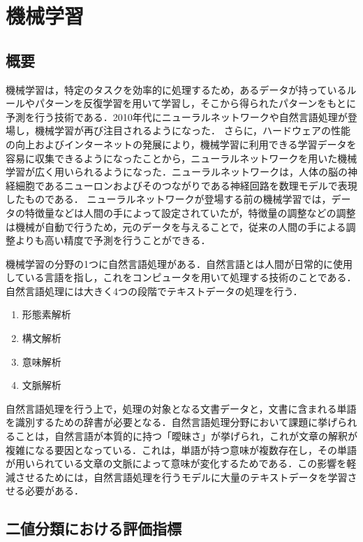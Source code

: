 \chapter{機械学習 \label{c4}}

\section{概要\label{c4s1}}
機械学習は，特定のタスクを効率的に処理するため，あるデータが持っているルールやパターンを反復学習を用いて学習し，そこから得られたパターンをもとに予測を行う技術である．2010年代にニューラルネットワークや自然言語処理が登場し，機械学習が再び注目されるようになった．
さらに，ハードウェアの性能の向上およびインターネットの発展により，機械学習に利用できる学習データを容易に収集できるようになったことから，ニューラルネットワークを用いた機械学習が広く用いられるようになった．ニューラルネットワークは，人体の脳の神経細胞であるニューロンおよびそのつながりである神経回路を数理モデルで表現したものである．
ニューラルネットワークが登場する前の機械学習では，データの特徴量などは人間の手によって設定されていたが，特徴量の調整などの調整は機械が自動で行うため，元のデータを与えることで，従来の人間の手による調整よりも高い精度で予測を行うことができる．

機械学習の分野の1つに自然言語処理がある．自然言語とは人間が日常的に使用している言語を指し，これをコンピュータを用いて処理する技術のことである．自然言語処理には大きく4つの段階でテキストデータの処理を行う．

\begin{enumerate}
    \item 形態素解析
    \item 構文解析
    \item 意味解析
    \item 文脈解析
\end{enumerate}

自然言語処理を行う上で，処理の対象となる文書データと，文書に含まれる単語を識別するための辞書が必要となる．自然言語処理分野において課題に挙げられることは，自然言語が本質的に持つ「曖昧さ」が挙げられ，これが文章の解釈が複雑になる要因となっている．これは，単語が持つ意味が複数存在し，その単語が用いられている文章の文脈によって意味が変化するためである．この影響を軽減させるためには，自然言語処理を行うモデルに大量のテキストデータを学習させる必要がある．

\section{二値分類における評価指標 \label{c4s2}}


